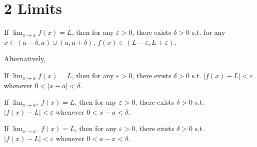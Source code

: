 \section*{2 Limits}


\begin{definition}[Limit]
  If $\displaystyle\lim_{x \to a} f(x) = L$, then for any $\varepsilon > 0$, there exists $\delta > 0$ s.t. for any $x \in (a - \delta, a) \cup (a, a + \delta)$, $f(x) \in (L - \varepsilon, L + \varepsilon)$.
\end{definition}

Alternatively,

\begin{definition}[Limit]
  If $\displaystyle\lim_{x \to a} f(x) = L$, then for any $\varepsilon > 0$, there exists $\delta > 0$ s.t. $|f(x) - L| < \varepsilon$ whenever $0 < |x - a| < \delta$.
\end{definition}

\begin{definition}
  If $\displaystyle\lim_{x \to a^+} f(x) = L$, then for any $\varepsilon > 0$, there exists $\delta > 0$ s.t. $|f(x) - L| < \varepsilon$ whenever $0 < x - a < \delta$.
\end{definition}

\begin{definition}
  If $\displaystyle\lim_{x \to a^-} f(x) = L$, then for any $\varepsilon > 0$, there exists $\delta > 0$ s.t. $|f(x) - L| < \varepsilon$ whenever $0 < a - x < \delta$.
\end{definition}


